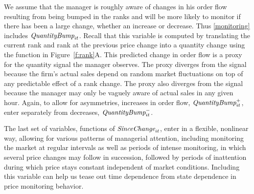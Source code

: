 \documentclass[11pt]{article}
\newcommand{\SinceChange}{\mbox{\it SinceChange}}
\newcommand{\QuantityBump}{\mbox{\it QuantityBump}}
\begin{document}
\begin{spacing}{1.3}
We assume that the manager is roughly aware of changes in his order
flow resulting from being bumped in the ranks and will be more likely
to monitor if there has been a large change, whether an increase or
decrease. Thus \eqref{monitoring} includes
$\QuantityBump_{it}$. Recall that this variable is computed by
translating the current rank and rank at the previous price change
into a quantity change using the function in
Figure~\ref{f:rank}A. This predicted change in order flow is a proxy
for the quantity signal the manager observes. The proxy diverges from
the signal because the firm's actual sales depend on random market
fluctuations on top of any predictable effect of a rank change. The
proxy also diverges from the signal because the manager may only be
vaguely aware of actual sales in any given hour. Again, to allow for
asymmetries, increases in order flow, $\QuantityBump_{it}^+$, enter
separately from decreases, $\QuantityBump_{it}^-$.

The last set of variables, functions of $\SinceChange_{it}$, enter in
a flexible, nonlinear way, allowing for various patterns of managerial
attention, including monitoring the market at regular intervals as
well as periods of intense monitoring, in which several price changes
may follow in succession, followed by periods of inattention during
which price stays constant independent of market conditions.
Including this variable can help us tease out time dependence from
state dependence in price monitoring behavior.  


\end{spacing}
\end{document}
